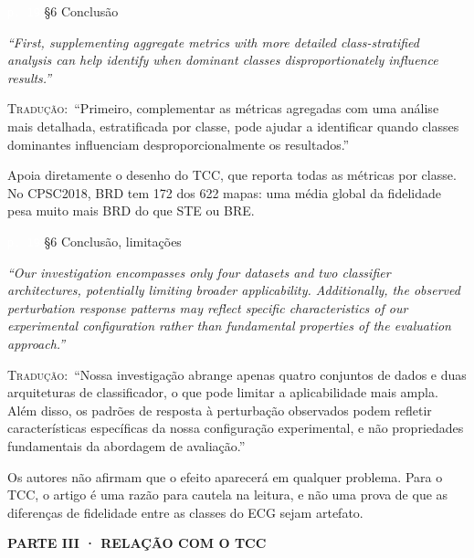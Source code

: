 \documentclass[11pt,a4paper]{article}
\newcommand{\pagechip}[1]{{\setlength{\fboxsep}{1.5pt}\colorbox{cAcc}{\textcolor{white}{\scriptsize\texttt{#1}}}}}
\newcommand{\partbar}[1]{\par\vspace{1.2em}\noindent\colorbox{black!80}{\parbox{\dimexpr\linewidth-2\fboxsep}{\color{white}\bfseries\sffamily\MakeUppercase{#1}}}\par\vspace{0.4em}}
\newenvironment{origquote}{\par\itshape\small}{\par}
\newenvironment{tradquote}{\par\small\textsc{Tradução:}\ }{\par}
\newcommand{\explab}[1]{\par\smallskip{\small\color{cAcc}\textbf{\MakeUppercase{#1}}}\par}
\begin{document}
\begin{citacard}{\pagechip{p. 19} §6 Conclusão}
\begin{origquote}“First, supplementing aggregate metrics with more detailed class-stratified analysis can help identify when dominant classes disproportionately influence results.”\end{origquote}
\begin{tradquote}“Primeiro, complementar as métricas agregadas com uma análise mais detalhada, estratificada por classe, pode ajudar a identificar quando classes dominantes influenciam desproporcionalmente os resultados.”\end{tradquote}
\explab{Explicação}
Apoia diretamente o desenho do TCC, que reporta todas as métricas por classe. No CPSC2018, BRD tem 172 dos 622 mapas: uma média global da fidelidade pesa muito mais BRD do que STE ou BRE.
\end{citacard}

\begin{citacard}{\pagechip{p. 19} §6 Conclusão, limitações}
\begin{origquote}“Our investigation encompasses only four datasets and two classifier architectures, potentially limiting broader applicability. Additionally, the observed perturbation response patterns may reflect specific characteristics of our experimental configuration rather than fundamental properties of the evaluation approach.”\end{origquote}
\begin{tradquote}“Nossa investigação abrange apenas quatro conjuntos de dados e duas arquiteturas de classificador, o que pode limitar a aplicabilidade mais ampla. Além disso, os padrões de resposta à perturbação observados podem refletir características específicas da nossa configuração experimental, e não propriedades fundamentais da abordagem de avaliação.”\end{tradquote}
\explab{Explicação}
Os autores não afirmam que o efeito aparecerá em qualquer problema. Para o TCC, o artigo é uma razão para cautela na leitura, e não uma prova de que as diferenças de fidelidade entre as classes do ECG sejam artefato.
\end{citacard}

\partbar{Parte III · Relação com o TCC}
\end{document}
